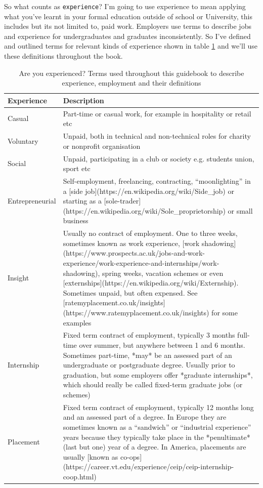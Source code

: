 \documentclass[
]{book}
\begin{document}
So what counts as \texttt{experience}? I'm going to use experience to mean applying what you've learnt in your formal education outside of school or University, this includes but its not limited to, paid work. Employers use terms to describe jobs and experience for undergraduates and graduates inconsistently. So I've defined and outlined terms for relevant kinds of experience shown in table \ref{tab:jobterms} and we'll use these definitions throughout the book.

\begin{table}

\caption{\label{tab:jobterms}Are you experienced? Terms used throughout this guidebook to describe experience, employment and their definitions}
\centering
\begin{tabular}[t]{ll}
\toprule
Experience & Description\\
\midrule
Casual & Part-time or casual work, for example in hospitality or retail etc\\
Voluntary & Unpaid, both in technical and non-technical roles for charity or nonprofit organisation\\
Social & Unpaid, participating in a club or society e.g. students union, sport etc\\
Entrepreneurial & Self-employment, freelancing, contracting, “moonlighting” in a [side job](https://en.wikipedia.org/wiki/Side\_job) or starting as a [sole-trader](https://en.wikipedia.org/wiki/Sole\_proprietorship) or small business\\
Insight & Usually no contract of employment. One to three weeks, sometimes known as work experience, [work shadowing](https://www.prospects.ac.uk/jobs-and-work-experience/work-experience-and-internships/work-shadowing), spring weeks, vacation schemes or even [externships](https://en.wikipedia.org/wiki/Externship). Sometimes unpaid, but often expensed. See [ratemyplacement.co.uk/insights](https://www.ratemyplacement.co.uk/insights) for some examples\\
\addlinespace
Internship & Fixed term contract of employment, typically 3 months full-time over summer, but anywhere between 1 and 6 months. Sometimes part-time, *may* be an assessed part of an undergraduate or postgraduate degree. Usually prior to graduation, but some employers offer *graduate internships*, which should really be called fixed-term graduate jobs (or schemes)\\
Placement & Fixed term contract of employment, typically 12 months long and an assessed part of a degree. In Europe they are sometimes known as a “sandwich” or “industrial experience” years because they typically take place in the *penultimate* (last but one) year of a degree. In America, placements are usually [known as co-ops](https://career.vt.edu/experience/ceip/ceip-internship-coop.html)\\

\end{tabular}
\end{table}
\end{document}
